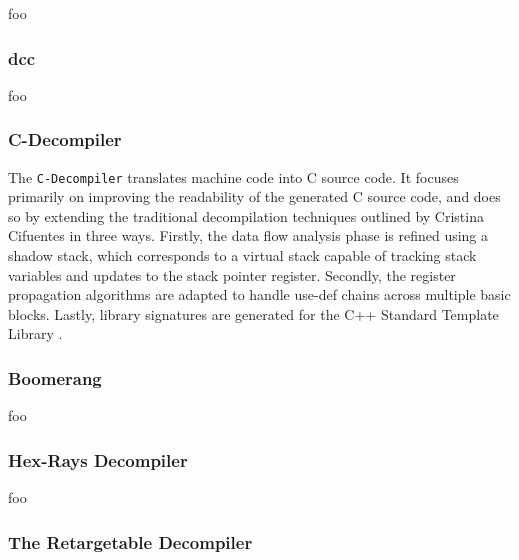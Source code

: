 foo


\subsubsection{dcc}

foo

\cite{rev_comp}


\subsubsection{C-Decompiler}

The \texttt{C-Decompiler} translates machine code into C source code. It focuses primarily on improving the readability of the generated C source code, and does so by extending the traditional decompilation techniques outlined by Cristina Cifuentes in three ways. Firstly, the data flow analysis phase is refined using a shadow stack, which corresponds to a virtual stack capable of tracking stack variables and updates to the stack pointer register. Secondly, the register propagation algorithms are adapted to handle use-def chains across multiple basic blocks. Lastly, library signatures are generated for the C++ Standard Template Library \cite{readable_decomp}.


\subsubsection{Boomerang}

foo

\cite{boomerang}


\subsubsection{Hex-Rays Decompiler}

foo

\cite{hexrays}


\subsubsection{The Retargetable Decompiler}
\label{retargetable_decomp_section}

